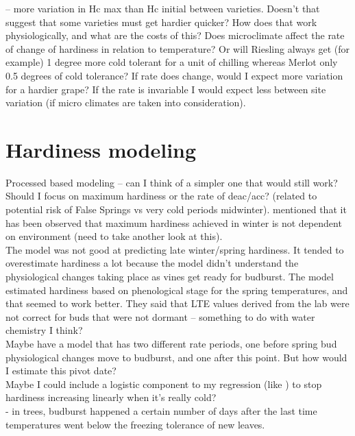 \documentclass[11pt,letter]{article}
\begin{document}
\cite{Ferguson2014} – more variation in Hc max than Hc initial between varieties. Doesn't that suggest that some varieties must get hardier quicker? How does that work physiologically, and what are the costs of this? Does microclimate affect the rate of change of hardiness in relation to temperature? Or will Riesling always get (for example) 1 degree more cold tolerant for a unit of chilling whereas Merlot only 0.5 degrees of cold tolerance? If rate does change, would I expect more variation for a hardier grape? If the rate is invariable I would expect less between site variation (if micro climates are taken into consideration). \\

\section{Hardiness modeling}
Processed based modeling – can I think of a simpler one that would still work? \\

Should I focus on maximum hardiness or the rate of deac/acc? (related to potential risk of False Springs vs very cold periods midwinter). \cite{Charrier2013} mentioned that it has been observed that maximum hardiness achieved in winter is not dependent on environment (need to take another look at this).\\

The \cite{Ferguson2011} model was not good at predicting late winter/spring hardiness. It tended to overestimate hardiness a lot because the model didn't understand the physiological changes taking place as vines get ready for budburst. The \cite{Ferguson2014} model estimated hardiness based on phenological stage for the spring temperatures, and that seemed to work better. They said that LTE values derived from the lab were not correct for buds that were not dormant – something to do with water chemistry I think?\\

Maybe have a model that has two different rate periods, one before spring  bud physiological changes move to budburst, and one after this point. But how would I estimate this pivot date? \\

Maybe I could include a logistic component to my regression (like \cite{Ferguson2011}) to stop hardiness increasing linearly when it’s really cold? \\

\cite{Lenz2016} - in trees, budburst happened a certain number of days after the last time temperatures went below the freezing tolerance of new leaves. \\
\end{document}
